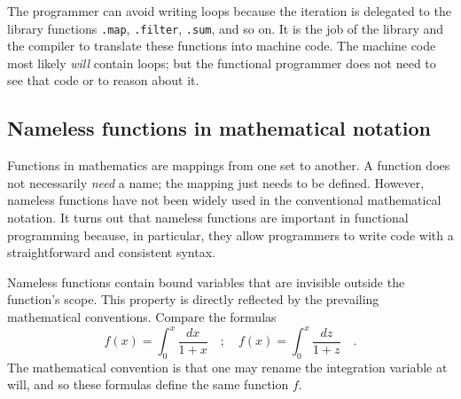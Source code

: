 The programmer can avoid writing loops because the iteration is delegated
to the library functions \lstinline!.map!, \lstinline!.filter!,
\lstinline!.sum!, and so on. It is the job of the library and the
compiler to translate these functions into machine code. The machine
code most likely \emph{will} contain loops; but the functional programmer
does not need to see that code or to reason about it.

\subsection{Nameless functions in mathematical notation\label{subsec:Nameless-functions-in-mathematical-notation}}

Functions in mathematics are mappings from one set to another. A function
does not necessarily \emph{need} a name; the mapping just needs to
be defined. However, nameless functions have not been widely used
in the conventional mathematical notation. It turns out that nameless
functions are important in functional programming because, in particular,
they allow programmers to write code with a straightforward and consistent
syntax.

Nameless functions contain bound variables that are invisible outside
the function's scope. This property is directly reflected by the prevailing
mathematical conventions. Compare the formulas
\[
f\left(x\right)=\int_{0}^{x}\frac{dx}{1+x}\quad;\quad f\left(x\right)=\int_{0}^{x}\frac{dz}{1+z}\quad.
\]
The mathematical convention is that one may rename the integration
variable at will, and so these formulas define the same function $f$.

